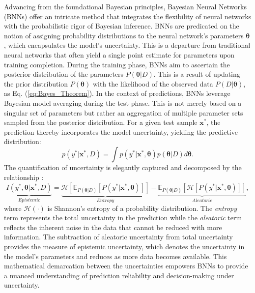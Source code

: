 Advancing from the foundational Bayesian principles, Bayesian Neural Networks (BNNs) offer an intricate method that integrates the flexibility of neural networks with the probabilistic rigor of Bayesian inference. 
BNNs are predicated on the notion of assigning probability distributions to the neural network's parameters $\boldsymbol{\theta}$, which encapsulates the model's uncertainty. 
This is a departure from traditional neural networks that often yield a single point estimate for parameters upon training completion.
During the training phase, BNNs aim to ascertain the posterior distribution of the parameters $P(\boldsymbol{\theta}|D)$. 
This is a result of updating the prior distribution $P(\boldsymbol{\theta})$ with the likelihood of the observed data $P(D|\boldsymbol{\theta})$, as Eq. (\ref{eq:Bayes_Theorem}).
In the context of predictions, BNNs leverage Bayesian model averaging during the test phase. 
This is not merely based on a singular set of parameters but rather an aggregation of multiple parameter sets sampled from the posterior distribution. 
For a given test sample $\mathbf{x}^*$, the prediction thereby incorporates the model uncertainty, yielding the predictive distribution:
\begin{equation}
    \label{eq:Bayes_prediction}
    p(y^* | \mathbf{x}^*, D) = \int p(y^* | \mathbf{x}^*, \boldsymbol{\theta}) p(\boldsymbol{\theta} | D) d\boldsymbol{\theta}.
\end{equation}
The quantification of uncertainty is elegantly captured and decomposed by the relationship \cite{depeweg2018decomposition}:
\begin{equation}
\label{eq:Bayes_AU_EU}
    \underbrace{I(y^*, \boldsymbol{\theta} | \mathbf{x}^*, D)}_{Epistemic} = \underbrace{\mathcal{H}\left[ \mathbb{E}_{P(\boldsymbol{\theta}|D)}\left[P(y^*|\mathbf{x}^*, \boldsymbol{\theta})\right]\right]}_{Entropy} - \underbrace{\mathbb{E}_{P(\boldsymbol{\theta}|D)}\left[\mathcal{H}\left[P(y^*|\mathbf{x}^*, \boldsymbol{\theta})\right]\right]}_{Aleatoric},
\end{equation}
where $\mathcal{H}(\cdot)$ is Shannon’s entropy of a probability distribution.
The \textit{entropy} term represents the total uncertainty in the prediction while the \textit{aleatoric} term reflects the inherent noise in the data that cannot be reduced with more information. 
The subtraction of aleatoric uncertainty from total uncertainty provides the measure of epistemic uncertainty, which denotes the uncertainty in the model's parameters and reduces as more data becomes available. 
This mathematical demarcation between the uncertainties empowers BNNs to provide a nuanced understanding of prediction reliability and decision-making under uncertainty.

